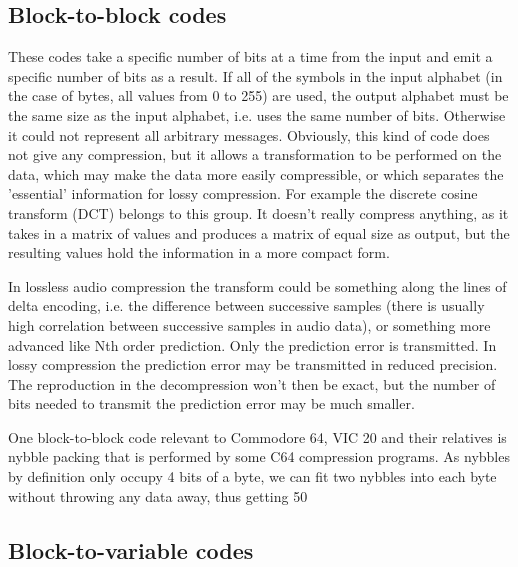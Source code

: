 \begin{frame}
\subsection*{Block-to-block codes}


These codes take a specific number of bits at a time from the input and emit a specific number of bits as a result. If all of the symbols in the input alphabet (in the case of bytes, all values from 0 to 255) are used, the output alphabet must be the same size as the input alphabet, i.e. uses the same number of bits. Otherwise it could not represent all arbitrary messages.
Obviously, this kind of code does not give any compression, but it allows a transformation to be performed on the data, which may make the data more easily compressible, or which separates the 'essential' information for lossy compression. For example the discrete cosine transform (DCT) belongs to this group. It doesn't really compress anything, as it takes in a matrix of values and produces a matrix of equal size as output, but the resulting values hold the information in a more compact form.

In lossless audio compression the transform could be something along the lines of delta encoding, i.e. the difference between successive samples (there is usually high correlation between successive samples in audio data), or something more advanced like Nth order prediction. Only the prediction error is transmitted. In lossy compression the prediction error may be transmitted in reduced precision. The reproduction in the decompression won't then be exact, but the number of bits needed to transmit the prediction error may be much smaller.

One block-to-block code relevant to Commodore 64, VIC 20 and their relatives is nybble packing that is performed by some C64 compression programs. As nybbles by definition only occupy 4 bits of a byte, we can fit two nybbles into each byte without throwing any data away, thus getting 50%
\end{frame}
\subsection*{Block-to-variable codes}


